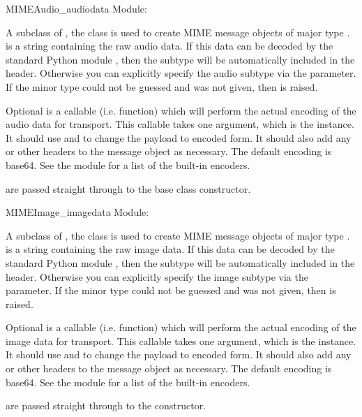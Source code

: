 \begin{classdesc}{MIMEAudio}{_audiodata}
Module: 

A subclass of , the  class
is used to create MIME message objects of major type .
 is a string containing the raw audio data.  If this
data can be decoded by the standard Python module ,
then the subtype will be automatically included in the
 header.  Otherwise you can explicitly specify the
audio subtype via the  parameter.  If the minor type could
not be guessed and  was not given, then 
is raised.

Optional  is a callable (i.e. function) which will
perform the actual encoding of the audio data for transport.  This
callable takes one argument, which is the  instance.
It should use  and  to
change the payload to encoded form.  It should also add any
 or other headers to the message
object as necessary.  The default encoding is base64.  See the
 module for a list of the built-in encoders.

 are passed straight through to the base class constructor.
\end{classdesc}

\begin{classdesc}{MIMEImage}{_imagedata}
Module: 

A subclass of , the  class is
used to create MIME message objects of major type .
 is a string containing the raw image data.  If this
data can be decoded by the standard Python module ,
then the subtype will be automatically included in the
 header.  Otherwise you can explicitly specify the
image subtype via the  parameter.  If the minor type could
not be guessed and  was not given, then 
is raised.

Optional  is a callable (i.e. function) which will
perform the actual encoding of the image data for transport.  This
callable takes one argument, which is the  instance.
It should use  and  to
change the payload to encoded form.  It should also add any
 or other headers to the message
object as necessary.  The default encoding is base64.  See the
 module for a list of the built-in encoders.

 are passed straight through to the 
constructor.
\end{classdesc}

